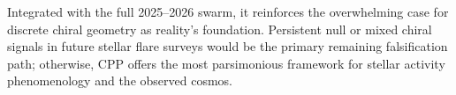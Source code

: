 \documentclass[11pt]{article}
\begin{document}
Integrated with the full 2025--2026 swarm, it reinforces the overwhelming case for discrete chiral geometry as reality's foundation. Persistent null or mixed chiral signals in future stellar flare surveys would be the primary remaining falsification path; otherwise, CPP offers the most parsimonious framework for stellar activity phenomenology and the observed cosmos.
\end{document}
